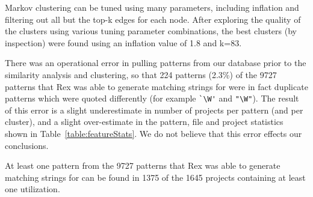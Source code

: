 Markov clustering can be tuned using many parameters, including inflation and filtering out all but the top-k edges for each node.  After exploring the quality of the clusters using various tuning parameter combinations, the best clusters (by inspection) were found using an inflation value of 1.8 and k=83.

There was an operational error in pulling patterns from our database prior to the similarity analysis and clustering, so that 224 patterns (2.3\%) of the 9727 patterns that Rex was able to generate matching strings for were in fact duplicate patterns which were quoted differently (for example \verb!`\W'! and \verb!"\W"!).  The result of this error is a slight underestimate in number of projects per pattern (and per cluster), and a slight over-estimate in the pattern, file and project statistics shown in Table~\ref{table:featureStats}.  We do not believe that this error effects our conclusions.


At least one pattern from the 9727 patterns that Rex was able to generate matching strings for can be found in 1375 of the 1645 projects containing at least one utilization.

